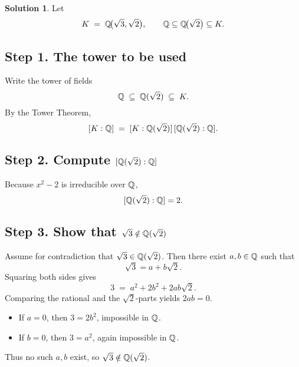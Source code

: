\documentclass[12pt]{article}
\theoremstyle{definition} %
\newtheorem{solution}{Solution}
\theoremstyle{plain} %
\begin{document}
          \begin{solution}
            Let
            \[
              K \;=\; \Bbb Q\!\bigl(\sqrt{3},\sqrt{2}\bigr),
              \qquad
              \Bbb Q \subseteq \Bbb Q\!\bigl(\sqrt{2}\bigr)\subseteq K.
            \]
            
            \subsection*{Step 1.  The tower to be used}
            
            Write the tower of fields  
            \[
               \Bbb Q \;\subseteq\; \Bbb Q(\sqrt{2}) \;\subseteq\; K .
            \]
            By the Tower Theorem,
            \[
              [K:\Bbb Q] \;=\; [K:\Bbb Q(\sqrt{2})]\,[\Bbb Q(\sqrt{2}):\Bbb Q].
            \]
            
            \subsection*{Step 2.  Compute \([\Bbb Q(\sqrt{2}):\Bbb Q]\)}
            
            Because \(x^{2}-2\) is irreducible over \(\Bbb Q\),  
            \[
              [\Bbb Q(\sqrt{2}):\Bbb Q]=2.
            \]
            
            \subsection*{Step 3.  Show that \(\sqrt{3}\notin\Bbb Q(\sqrt{2})\)}
            
            Assume for contradiction that \(\sqrt{3}\in\Bbb Q(\sqrt{2})\).
            Then there exist \(a,b\in\Bbb Q\) such that
            \[
              \sqrt{3}=a+b\sqrt{2}.
            \]
            Squaring both sides gives
            \[
              3 \;=\; a^{2}+2b^{2}+2ab\sqrt{2}.
            \]
            Comparing the rational and the \(\sqrt{2}\)-parts yields
            \(2ab=0\).  
            
            \begin{itemize}
              \item If \(a=0\), then \(3=2b^{2}\), impossible in \(\Bbb Q\).
              \item If \(b=0\), then \(3=a^{2}\), again impossible in \(\Bbb Q\).
            \end{itemize}
            Thus no such \(a,b\) exist, so \(\sqrt{3}\notin\Bbb Q(\sqrt{2})\).
            

\end{solution}
\end{document}
